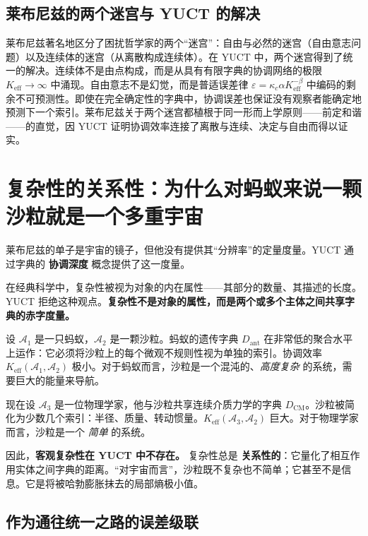 \documentclass[12pt,a4paper]{article}
\newcommand{\Keff}{K_{\mathrm{eff}}}
\begin{document}
	\subsection{莱布尼兹的两个迷宫与 YUCT 的解决}
	
	莱布尼兹著名地区分了困扰哲学家的两个“迷宫”：自由与必然的迷宫（自由意志问题）以及连续体的迷宫（从离散构成连续体）。在 YUCT 中，两个迷宫得到了统一的解决。连续体不是由点构成，而是从具有有限字典的协调网络的极限 \(K_{\mathrm{eff}} \to \infty\) 中涌现。自由意志不是幻觉，而是普适误差律 \(\varepsilon = \kappa_c \alpha K_{\mathrm{eff}}^{-\beta}\) 中编码的剩余不可预测性。即使在完全确定性的字典中，协调误差也保证没有观察者能确定地预测下一个索引。莱布尼兹关于两个迷宫都植根于同一形而上学原则——前定和谐——的直觉，因 YUCT 证明协调效率连接了离散与连续、决定与自由而得以证实。
	
	\section{复杂性的关系性：为什么对蚂蚁来说一颗沙粒就是一个多重宇宙}
	\label{sec:relational-complexity}
	
	莱布尼兹的单子是宇宙的镜子，但他没有提供其“分辨率”的定量度量。YUCT 通过字典的 \textbf{协调深度} 概念提供了这一度量。
	
	在经典科学中，复杂性被视为对象的内在属性——其部分的数量、其描述的长度。YUCT 拒绝这种观点。\textbf{复杂性不是对象的属性，而是两个或多个主体之间共享字典的赤字度量。}
	
	设 \(\mathcal{A}_1\) 是一只蚂蚁，\(\mathcal{A}_2\) 是一颗沙粒。蚂蚁的遗传字典 \(D_{\text{ant}}\) 在非常低的聚合水平上运作：它必须将沙粒上的每个微观不规则性视为单独的索引。协调效率 \(\Keff(\mathcal{A}_1, \mathcal{A}_2)\) 极小。对于蚂蚁而言，沙粒是一个混沌的、\emph{高度复杂} 的系统，需要巨大的能量来导航。
	
	现在设 \(\mathcal{A}_3\) 是一位物理学家，他与沙粒共享连续介质力学的字典 \(D_{\text{CM}}\)。沙粒被简化为少数几个索引：半径、质量、转动惯量。\(\Keff(\mathcal{A}_3, \mathcal{A}_2)\) 巨大。对于物理学家而言，沙粒是一个 \emph{简单} 的系统。
	
	因此，\textbf{客观复杂性在 YUCT 中不存在。} 复杂性总是 \textbf{关系性的}：它量化了相互作用实体之间字典的距离。“对宇宙而言”，沙粒既不复杂也不简单；它甚至不是信息。它是将被哈勃膨胀抹去的局部熵极小值。
	
	\subsection{作为通往统一之路的误差级联}
	\label{subsec:cascade}
	
\end{document}
